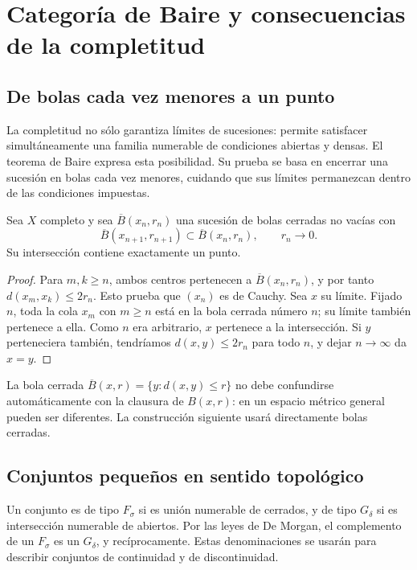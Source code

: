 \chapter{Categoría de Baire y consecuencias de la completitud}\label{chap:10}
\section{De bolas cada vez menores a un punto}
La completitud no sólo garantiza límites de sucesiones: permite satisfacer simultáneamente una familia numerable de condiciones abiertas y densas. El teorema de Baire expresa esta posibilidad. Su prueba se basa en encerrar una sucesión en bolas cada vez menores, cuidando que sus límites permanezcan dentro de las condiciones impuestas.

\begin{teorema}\label{ch10:bolas}
Sea $X$ completo y sea $\overline B(x_n,r_n)$ una sucesión de bolas cerradas no vacías con
\[
 \overline B(x_{n+1},r_{n+1})\subset\overline B(x_n,r_n),
 \qquad r_n\longrightarrow0.
\]
Su intersección contiene exactamente un punto.
\end{teorema}
\begin{proof}
Para $m,k\geq n$, ambos centros pertenecen a $\overline B(x_n,r_n)$, y por tanto $d(x_m,x_k)\leq2r_n$. Esto prueba que $(x_n)$ es de Cauchy. Sea $x$ su límite. Fijado $n$, toda la cola $x_m$ con $m\geq n$ está en la bola cerrada número $n$; su límite también pertenece a ella. Como $n$ era arbitrario, $x$ pertenece a la intersección. Si $y$ perteneciera también, tendríamos $d(x,y)\leq2r_n$ para todo $n$, y dejar $n\to\infty$ da $x=y$.
\end{proof}
La bola cerrada $\overline B(x,r)=\{y:d(x,y)\leq r\}$ no debe confundirse automáticamente con la clausura de $B(x,r)$: en un espacio métrico general pueden ser diferentes. La construcción siguiente usará directamente bolas cerradas.

\section{Conjuntos pequeños en sentido topológico}
\begin{definicion}
Un conjunto es de tipo $F_\sigma$ si es unión numerable de cerrados, y de tipo $G_\delta$ si es intersección numerable de abiertos. Por las leyes de De Morgan, el complemento de un $F_\sigma$ es un $G_\delta$, y recíprocamente. Estas denominaciones se usarán para describir conjuntos de continuidad y de discontinuidad.
\end{definicion}


